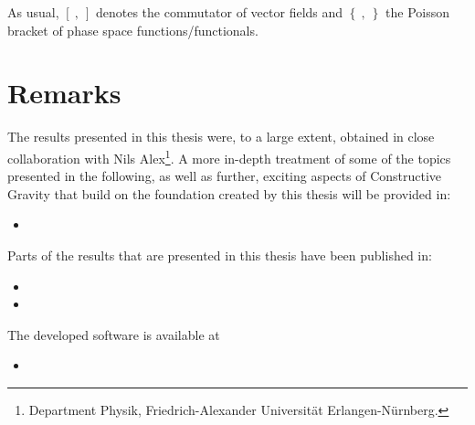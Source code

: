 As usual, $\left[ \  ,   \  \right]$ denotes the commutator of vector fields and $\left \{  \  ,   \   \right \}$ the Poisson bracket of phase space functions/functionals. \\

\newpage

\section*{Remarks}

The results presented in this thesis were, to a large extent, obtained in close collaboration with Nils Alex\footnote{Department Physik, Friedrich-Alexander Universität Erlangen-Nürnberg.}. 
A more in-depth treatment of some of the topics presented in the following, as well as further, exciting aspects of Constructive Gravity that build on the foundation created by this thesis will be provided in:
\begin{itemize}
    \item {}
\end{itemize}
Parts of the results that are presented in this thesis have been published in:
\begin{itemize}
    \item {}
    \item {}
\end{itemize}
The developed software is available at
\begin{itemize}
    \item {}
\end{itemize}